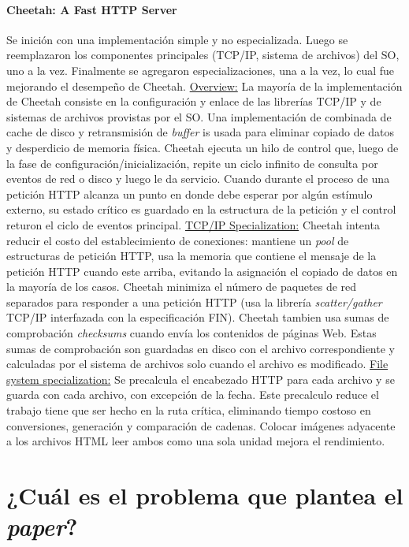 \paragraph{\textnormal{\textbf{Cheetah: A Fast HTTP Server}}}
Se inición con una implementación simple y no especializada. Luego se reemplazaron los componentes principales (TCP/IP, sistema de archivos) del SO, uno a la vez. Finalmente se agregaron especializaciones, una a la vez, lo cual fue mejorando el desempeño de Cheetah. \underline{Overview:} La mayoría de la implementación de Cheetah consiste en la configuración y enlace de las librerías TCP/IP y de sistemas de archivos provistas por el SO. Una implementación de combinada de cache de disco y retransmisión de \textit{buffer} is usada para eliminar copiado de datos y desperdicio de memoria física. Cheetah ejecuta un hilo de control que, luego de la fase de configuración/inicialización, repite un ciclo infinito de consulta por eventos de red o disco y luego le da servicio. Cuando durante el proceso de una petición HTTP alcanza un punto en donde debe esperar por algún estímulo externo, su estado crítico es guardado en la estructura de la petición y el control returon el ciclo de eventos principal. \underline{TCP/IP Specialization:} Cheetah intenta reducir el costo del establecimiento de conexiones: mantiene un \textit{pool} de estructuras de petición HTTP, usa la memoria que contiene el mensaje de la petición HTTP cuando este arriba, evitando la asignación el copiado de datos en la mayoría de los casos. Cheetah minimiza el número de paquetes de red separados para responder a una petición HTTP (usa la librería \textit{scatter/gather} TCP/IP interfazada con la especificación FIN). Cheetah tambien usa sumas de comprobación \textit{checksums} cuando envía los contenidos de páginas Web. Estas sumas de comprobación son guardadas en disco con el archivo correspondiente y calculadas por el sistema de archivos solo cuando el archivo es modificado. \underline{File system specialization:} Se precalcula el encabezado HTTP para cada archivo y se guarda con cada archivo, con excepción de la fecha. Este precalculo reduce el trabajo tiene que ser hecho en la ruta crítica, eliminando tiempo costoso en conversiones, generación y comparación de cadenas. Colocar imágenes adyacente a los archivos HTML leer ambos como una sola unidad mejora el rendimiento.


\section{¿Cuál es el problema que plantea el \textit{paper}?}

